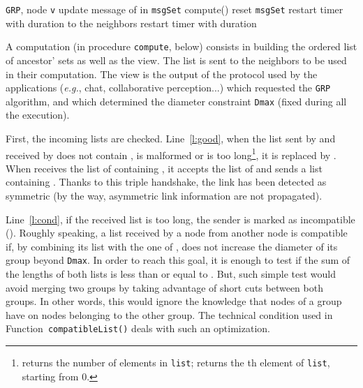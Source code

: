 \documentclass[11pt,english]{article}
\newcommand{\Latin}[1]{\textit{#1}}
\newcommand{\eg}{\Latin{e.g.},\xspace}
\begin{document}
\begin{footnotesize}
\begin{algorithm*}{\texttt{GRP}, node \texttt{v}}
  \I update message of  in \texttt{msgSet}
\ENDACTION
{}
  \I compute()
  \I reset \texttt{msgSet}
  \I restart timer  with duration 
\ENDACTION
{}
   to the neighbors \label{l:send}
  \I restart timer  with duration 
\end{algorithm*}
\end{footnotesize}

A computation (in procedure \texttt{compute}, below) consists in building the
ordered list of ancestor' sets as well as the view. The list is sent to the
neighbors to be used in their  computation. The view is the output
of the protocol used by the applications (\eg chat, collaborative perception...)
which requested the \texttt{GRP} algorithm, and which determined the diameter
constraint \texttt{Dmax} (fixed during all the execution).

First, the incoming lists are checked.  Line~\ref{l:good}, when the list sent by
 and received by  does not contain , is malformed or is too
long\footnote{ returns the number of elements in
\texttt{list};  returns the th element of \texttt{list},
starting from 0.}, it is replaced by .  When  receives the
list of  containing , it accepts the list of  and sends a
list containing . Thanks to this triple handshake, the link has been detected
as symmetric (by the way, asymmetric link information are not propagated).

Line~\ref{l:cond}, if the received list is too long, the sender  is marked as
incompatible ().  Roughly speaking, a list received
by a node  from another node  is compatible if, by combining its list with
the one of ,  does not increase the diameter of its group beyond
\texttt{Dmax}.
In order to reach this goal, it is enough to test if the sum of the lengths of
both lists is less than or equal to .  But, such simple test
would avoid merging two groups by taking advantage of short cuts between both
groups.  In other words, this would ignore the knowledge that nodes of a group
have on nodes belonging to the other group.  The technical condition used in
Function~\texttt{compatibleList()} deals with such an optimization.
\end{document}
